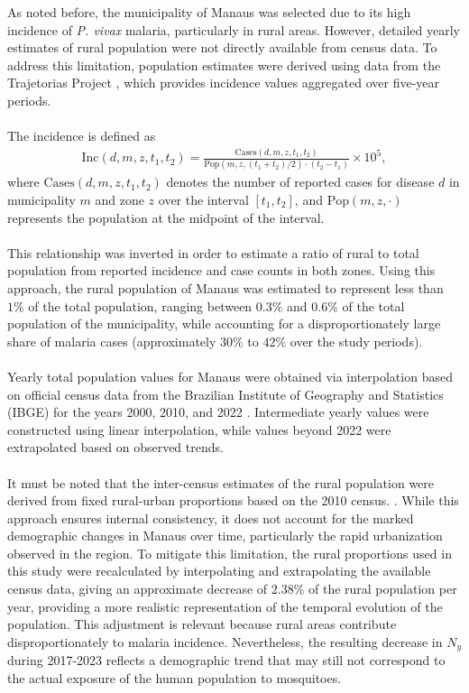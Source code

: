 \documentclass[a4paper,fleqn]{cas-dc}
\begin{document}
As noted before, the municipality of Manaus was selected due to its high incidence of \textit{P. vivax} malaria, 
particularly in rural areas. However, detailed yearly estimates of rural population were not directly available 
from census data. To address this limitation, population estimates were derived using data from the 
Trajetorias Project \cite{Rorato2023}, which provides incidence values aggregated over five-year periods.
\\\\
The incidence is defined as
\begin{align}
\text{Inc}(d,m,z,t_1,t_2)
=
\frac{\text{Cases}(d,m,z,t_1,t_2)}
{\text{Pop}(m,z,(t_1+t_2)/2)\cdot (t_2-t_1)}
\times 10^5,
\end{align}
where $\text{Cases}(d,m,z,t_1,t_2)$ denotes the number of reported cases for 
disease $d$ in municipality $m$ and zone $z$ over the interval $[t_1,t_2]$, 
and $\text{Pop}(m,z,\cdot)$ represents the population at the midpoint of the interval.
\\\\
This relationship was inverted in order to estimate a ratio of rural to total population from reported incidence and case counts in both zones. 
Using this approach, the rural population of Manaus was estimated to represent less than $1\%$ of the total population, ranging between $0.3\%$ and $0.6\%$ 
of the total population of the municipality, while accounting for a disproportionately large share of malaria cases (approximately $30\%$ to $42\%$ over the study periods).
\\\\
Yearly total population values for Manaus were obtained via interpolation based on official census data from 
the Brazilian Institute of Geography and Statistics (IBGE) for the years 2000, 2010, and 
2022 \cite{Census2000, Census2010, Census2022}. Intermediate yearly values were constructed using 
linear interpolation, while values beyond 2022 were extrapolated based on observed trends.
\\\\
It must be noted that the inter-census estimates of the rural population were derived from fixed
rural-urban proportions based on the 2010 census. \cite{Rorato2023}. While this approach
ensures internal consistency, it does not account for the marked
demographic changes in Manaus over time, particularly the rapid
urbanization observed in the region. To mitigate this limitation, the
rural proportions used in this study were recalculated by interpolating and
extrapolating the available census data, giving an approximate decrease of $2.38\%$ of the rural population per year, 
providing a more realistic
representation of the temporal evolution of the population. This
adjustment is relevant because rural areas contribute
disproportionately to malaria incidence. Nevertheless, the resulting
decrease in $N_y$ during 2017-2023 reflects a demographic trend that
may still not correspond to the actual exposure of the human population
to mosquitoes. 
\end{document}
